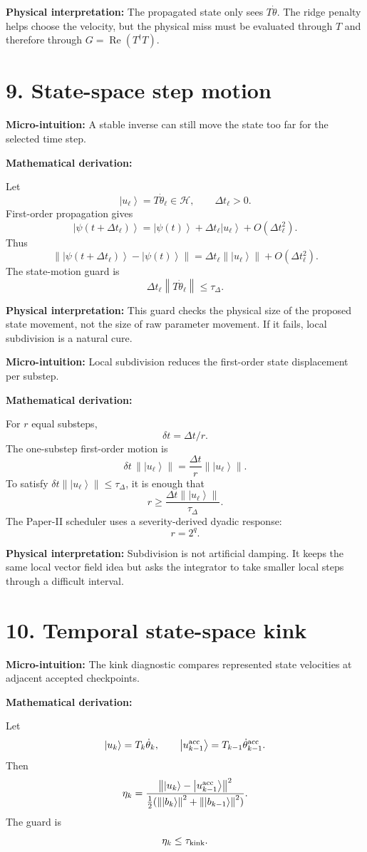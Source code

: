 \documentclass[10pt,twocolumn]{article}
\newcommand{\ket}[1]{\left|#1\right\rangle}
\newcommand{\norm}[1]{\left\lVert #1\right\rVert}
\newcommand{\Hh}{\mathcal H}
\newcommand{\Real}{\operatorname{Re}}
\newcommand{\micro}[1]{%
  \par\smallskip
  \noindent\textcolor{deepblue}{\textbf{Micro-intuition:}} #1
  \par\smallskip}
\newcommand{\deriv}{%
  \par\noindent\textcolor{deepviolet}{\textbf{Mathematical derivation:}}\par\vspace{-1mm}}
\newcommand{\phys}[1]{%
  \par\smallskip
  \noindent\textcolor{deepgreen}{\textbf{Physical interpretation:}} #1
  \par\smallskip}
\begin{document}
\phys{The propagated state only sees \(T\dot\theta\). The ridge penalty helps
choose the velocity, but the physical miss must be evaluated through \(T\) and
therefore through \(G=\Real(T^\dagger T)\).}

\section*{9. State-space step motion}

\micro{A stable inverse can still move the state too far for the selected time
step.}

\deriv
Let
\[
\ket{u_\ell}=T\dot\theta_\ell\in\Hh,
\qquad
\Delta t_\ell>0.
\]
First-order propagation gives
\[
\ket{\psi(t+\Delta t_\ell)}
=\ket{\psi(t)}+\Delta t_\ell\ket{u_\ell}+O(\Delta t_\ell^2).
\]
Thus
\[
\norm{\ket{\psi(t+\Delta t_\ell)}-\ket{\psi(t)}}
=
\Delta t_\ell\norm{\ket{u_\ell}}+
O(\Delta t_\ell^2).
\]
The state-motion guard is
\[
\Delta t_\ell\norm{T\dot\theta_\ell}\le\tau_\Delta.
\]

\phys{This guard checks the physical size of the proposed state movement, not
the size of raw parameter movement. If it fails, local subdivision is a natural
cure.}

\micro{Local subdivision reduces the first-order state displacement per
substep.}

\deriv
For \(r\) equal substeps,
\[
\delta t=\Delta t/r.
\]
The one-substep first-order motion is
\[
\delta t\,\norm{\ket{u_\ell}}
=\frac{\Delta t}{r}\norm{\ket{u_\ell}}.
\]
To satisfy \(\delta t\norm{\ket{u_\ell}}\le\tau_\Delta\), it is enough that
\[
r\ge \frac{\Delta t\norm{\ket{u_\ell}}}{\tau_\Delta}.
\]
The Paper-II scheduler uses a severity-derived dyadic response:
\[
r=2^q.
\]

\phys{Subdivision is not artificial damping. It keeps the same local vector
field idea but asks the integrator to take smaller local steps through a
difficult interval.}

\section*{10. Temporal state-space kink}

\micro{The kink diagnostic compares represented state velocities at adjacent
accepted checkpoints.}

\deriv
Let
\[
\ket{u_k}=T_k\dot\theta_k,\qquad
\ket{u_{k-1}^{\rm acc}}=T_{k-1}\dot\theta_{k-1}^{\rm acc}.
\]
Then
\[
\eta_k
=
\frac{\norm{\ket{u_k}-\ket{u_{k-1}^{\rm acc}}}^2}
{\tfrac12(\norm{\ket{b_k}}^2+\norm{\ket{b_{k-1}}}^2)}.
\]
The guard is
\[
\eta_k\le\tau_{\rm kink}.
\]
\end{document}
